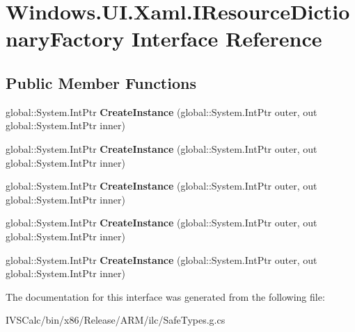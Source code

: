 \hypertarget{interface_windows_1_1_u_i_1_1_xaml_1_1_i_resource_dictionary_factory}{}\section{Windows.\+U\+I.\+Xaml.\+I\+Resource\+Dictionary\+Factory Interface Reference}
\label{interface_windows_1_1_u_i_1_1_xaml_1_1_i_resource_dictionary_factory}
\subsection*{Public Member Functions}
\begin{DoxyCompactItemize}
\item 
\mbox{\label{interface_windows_1_1_u_i_1_1_xaml_1_1_i_resource_dictionary_factory_a673767bd6582d97228e7838b2d53e8cb}} 
global\+::\+System.\+Int\+Ptr {\bfseries Create\+Instance} (global\+::\+System.\+Int\+Ptr outer, out global\+::\+System.\+Int\+Ptr inner)
\item 
\mbox{\label{interface_windows_1_1_u_i_1_1_xaml_1_1_i_resource_dictionary_factory_a673767bd6582d97228e7838b2d53e8cb}} 
global\+::\+System.\+Int\+Ptr {\bfseries Create\+Instance} (global\+::\+System.\+Int\+Ptr outer, out global\+::\+System.\+Int\+Ptr inner)
\item 
\mbox{\label{interface_windows_1_1_u_i_1_1_xaml_1_1_i_resource_dictionary_factory_a673767bd6582d97228e7838b2d53e8cb}} 
global\+::\+System.\+Int\+Ptr {\bfseries Create\+Instance} (global\+::\+System.\+Int\+Ptr outer, out global\+::\+System.\+Int\+Ptr inner)
\item 
\mbox{\label{interface_windows_1_1_u_i_1_1_xaml_1_1_i_resource_dictionary_factory_a673767bd6582d97228e7838b2d53e8cb}} 
global\+::\+System.\+Int\+Ptr {\bfseries Create\+Instance} (global\+::\+System.\+Int\+Ptr outer, out global\+::\+System.\+Int\+Ptr inner)
\item 
\mbox{\label{interface_windows_1_1_u_i_1_1_xaml_1_1_i_resource_dictionary_factory_a673767bd6582d97228e7838b2d53e8cb}} 
global\+::\+System.\+Int\+Ptr {\bfseries Create\+Instance} (global\+::\+System.\+Int\+Ptr outer, out global\+::\+System.\+Int\+Ptr inner)
\end{DoxyCompactItemize}


The documentation for this interface was generated from the following file\+:\begin{DoxyCompactItemize}
\item 
I\+V\+S\+Calc/bin/x86/\+Release/\+A\+R\+M/ilc/Safe\+Types.\+g.\+cs\end{DoxyCompactItemize}
